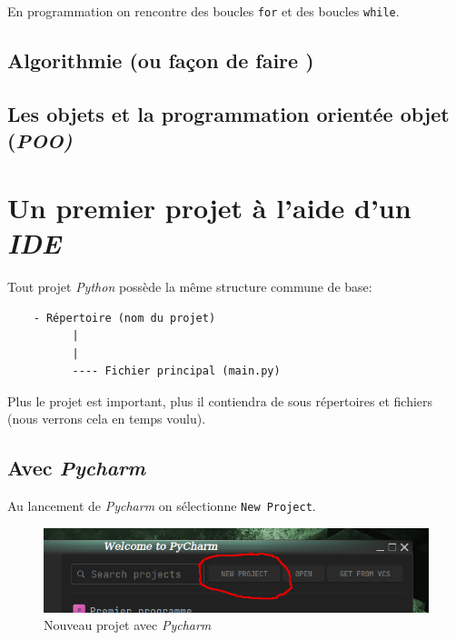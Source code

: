 \documentclass[a4paper,12pt]{book}
\begin{document}
En programmation on rencontre des boucles \texttt{for} et des boucles \texttt{while}.
\bigskip

\section{Algorithmie (ou \og façon de faire \fg{})}
\medskip

\section{Les objets et la programmation orientée objet (\textit{POO)}}
\medskip

\chapter{Un premier projet à l'aide d'un \textit{IDE}}
Tout projet \textit{Python} possède la même structure commune de base:
\begin{verbatim}
    - Répertoire (nom du projet)
          |
          |
          ---- Fichier principal (main.py)
\end{verbatim}
\medskip

Plus le projet est important, plus il contiendra de sous répertoires et fichiers (nous verrons cela en temps voulu).
\medskip

\section{Avec \textit{Pycharm}}
Au lancement de \textit{Pycharm} on sélectionne \texttt{New Project}.
\begin{figure}[h]
\begin{center}
\includegraphics[scale=0.3]{IMG/Pycharm-01.png}
\caption{Nouveau projet avec \textit{Pycharm}}
\end{center}
\end{figure}
\medskip
\end{document}
